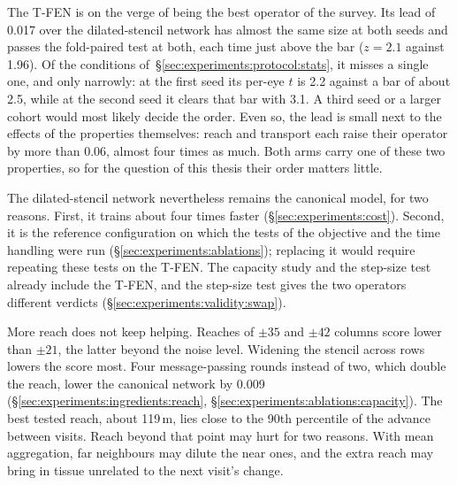 The T-FEN is on the verge of being the best operator of the survey. Its
lead of 0.017 over the dilated-stencil network has almost the same size at
both seeds and passes the fold-paired test at both, each time just above
the bar ($z = 2.1$ against 1.96). Of the conditions
of~\S\ref{sec:experiments:protocol:stats}, it misses a single one, and only
narrowly: at the first seed its per-eye $t$ is 2.2 against a bar of about
2.5, while at the second seed it clears that bar with 3.1. A third seed or
a larger cohort would most likely decide the order. Even so, the lead is
small next to the effects of the properties themselves: reach and
transport each raise their operator by more than 0.06, almost four times
as much. Both arms carry one of these two properties, so for the question
of this thesis their order matters little.

The dilated-stencil network nevertheless remains the canonical model, for
two reasons. First, it trains about four times faster
(\S\ref{sec:experiments:cost}). Second, it is the reference configuration
on which the tests of the objective and the time handling were run
(\S\ref{sec:experiments:ablations}); replacing it would require repeating
these tests on the T-FEN. The capacity study and the step-size test
already include the T-FEN, and the step-size test gives the two operators
different verdicts (\S\ref{sec:experiments:validity:swap}).

More reach does not keep helping. Reaches of $\pm 35$ and $\pm 42$ columns
score lower than $\pm 21$, the latter beyond the noise level. Widening the
stencil across rows lowers the score most. Four message-passing rounds
instead of two, which double the reach, lower the canonical network by
0.009 (\S\ref{sec:experiments:ingredients:reach},
\S\ref{sec:experiments:ablations:capacity}). The best tested reach, about
119\,\textmu{}m, lies close to the 90th percentile of the advance between
visits. Reach beyond that point may hurt for two reasons. With mean
aggregation, far neighbours may dilute the near ones, and the extra reach
may bring in tissue unrelated to the next visit's change.

